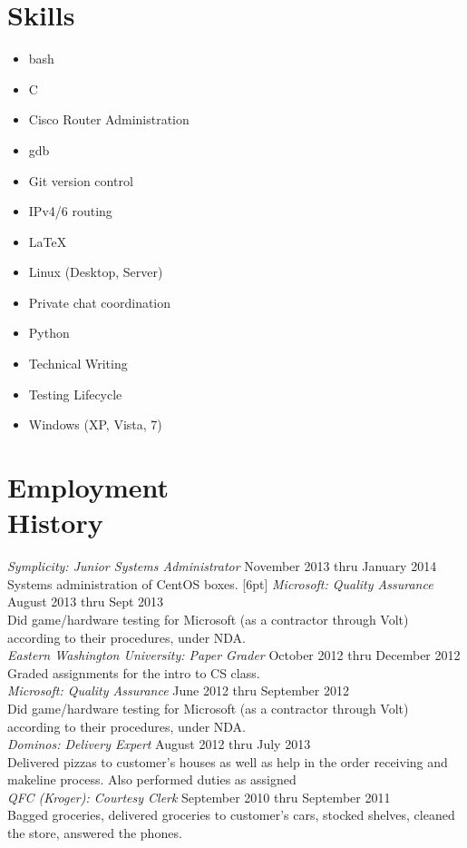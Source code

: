 \documentclass[line, margin]{res}
\begin{document}
\begin{resume}
\section{Skills}
\begin{multicols}{3}
  \begin{itemize}
    \item bash
    \item C
    \item Cisco Router Administration
    \item gdb
    \item Git version control
    \item IPv4/6 routing
    \item \LaTeX
    \item Linux (Desktop, Server)
    \item Private chat coordination
    \item Python
    \item Technical Writing
    \item Testing Lifecycle
    \item Windows (XP, Vista, 7)
  \end{itemize}
\end{multicols}

\section{Employment\\History}
 \textit{Symplicity: Junior Systems Administrator} \hfill November 2013 thru January 2014 \\
 Systems administration of CentOS boxes. [6pt]
 \textit{Microsoft: Quality Assurance} \hfill August 2013 thru Sept 2013 \\
 Did game/hardware testing for Microsoft (as a contractor through Volt) according to their procedures, under NDA. \\ [6pt]
 \textit{Eastern Washington University: Paper Grader} \hfill October 2012 thru December 2012 \\
 Graded assignments for the intro to CS class. \\ [6pt]
 \textit{Microsoft: Quality Assurance} \hfill June 2012 thru September 2012 \\
 Did game/hardware testing for Microsoft (as a contractor through Volt) according to their procedures, under NDA. \\ [6pt]
  \textit{Dominos: Delivery Expert} \hfill August 2012 thru July 2013 \\
 Delivered pizzas to customer's houses as well as help in the order
 receiving and makeline process. Also performed duties as assigned \\ [6pt]
 \textit{QFC (Kroger): Courtesy Clerk} \hfill September 2010 thru September 2011 \\
 Bagged groceries, delivered groceries to customer's cars, stocked
 shelves, cleaned the store, answered the phones. \\ 

\end{resume}
\end{document}
